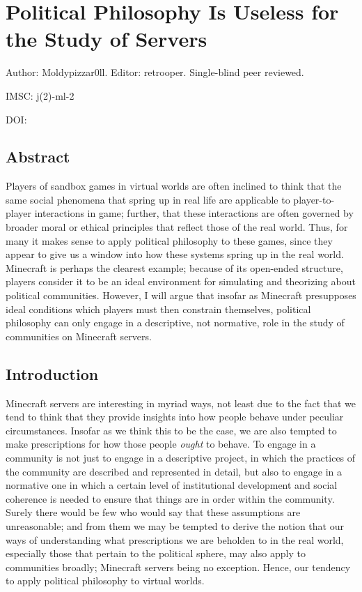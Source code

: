\chapter{Political Philosophy Is Useless for the Study of Servers}

\begin{center}
    Author: Moldypizzar0ll. Editor: retrooper. Single-blind peer reviewed. %
\end{center}

\begin{flushright}
    IMSC: j(2)-ml-2

    DOI: 
\end{flushright}


\section*{Abstract}
Players of sandbox games in virtual worlds are often inclined to think that the same social phenomena that spring up in real life are applicable to player-to-player interactions in game; further, that these interactions are often governed by broader moral or ethical principles that reflect those of the real world. Thus, for many it makes sense to apply political philosophy to these games, since they appear to give us a window into how these systems spring up in the real world. Minecraft is perhaps the clearest example; because of its open-ended structure, players consider it to be an ideal environment for simulating and theorizing about political communities. However, I will argue that insofar as Minecraft presupposes ideal conditions which players must then constrain themselves, political philosophy can only engage in a descriptive, not normative, role in the study of communities on Minecraft servers.

\section{Introduction}
Minecraft servers are interesting in myriad ways, not least due to the fact that we tend to think that they provide insights into how people behave under peculiar circumstances. Insofar as we think this to be the case, we are also tempted to make prescriptions for how those people \emph{ought} to behave. To engage in a community is not just to engage in a descriptive project, in which the practices of the community are described and represented in detail, but also to engage in a normative one in which a certain level of institutional development and social coherence is needed to ensure that things are in order within the community. Surely there would be few who would say that these assumptions are unreasonable; and from them we may be tempted to derive the notion that our ways of understanding what prescriptions we are beholden to in the real world, especially those that pertain to the political sphere, may also apply to communities broadly; Minecraft servers being no exception. Hence, our tendency to apply political philosophy to virtual worlds.

